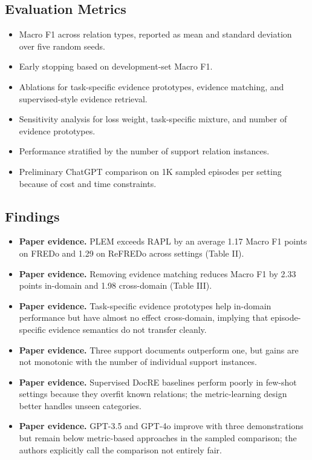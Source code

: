 \documentclass[11pt]{article}
\begin{document}
\subsection{Evaluation Metrics}\label{evaluation-metrics-4}

\begin{itemize}
\item
  Macro F1 across relation types, reported as mean and standard
  deviation over five random seeds.
\item
  Early stopping based on development-set Macro F1.
\item
  Ablations for task-specific evidence prototypes, evidence matching,
  and supervised-style evidence retrieval.
\item
  Sensitivity analysis for loss weight, task-specific mixture, and
  number of evidence prototypes.
\item
  Performance stratified by the number of support relation instances.
\item
  Preliminary ChatGPT comparison on 1K sampled episodes per setting
  because of cost and time constraints.
\end{itemize}

\subsection{Findings}\label{findings-4}

\begin{itemize}
\item
  \textbf{Paper evidence.} PLEM exceeds RAPL by an average 1.17 Macro F1 points on
  FREDo and 1.29 on ReFREDo across settings (Table II).
\item
  \textbf{Paper evidence.} Removing evidence matching reduces Macro F1 by 2.33 points
  in-domain and 1.98 cross-domain (Table III).
\item
  \textbf{Paper evidence.} Task-specific evidence prototypes help in-domain performance
  but have almost no effect cross-domain, implying that episode-specific
  evidence semantics do not transfer cleanly.
\item
  \textbf{Paper evidence.} Three support documents outperform one, but gains are not
  monotonic with the number of individual support instances.
\item
  \textbf{Paper evidence.} Supervised DocRE baselines perform poorly in few-shot
  settings because they overfit known relations; the metric-learning
  design better handles unseen categories.
\item
  \textbf{Paper evidence.} GPT-3.5 and GPT-4o improve with three demonstrations but
  remain below metric-based approaches in the sampled comparison; the
  authors explicitly call the comparison not entirely fair.
\end{itemize}
\end{document}
